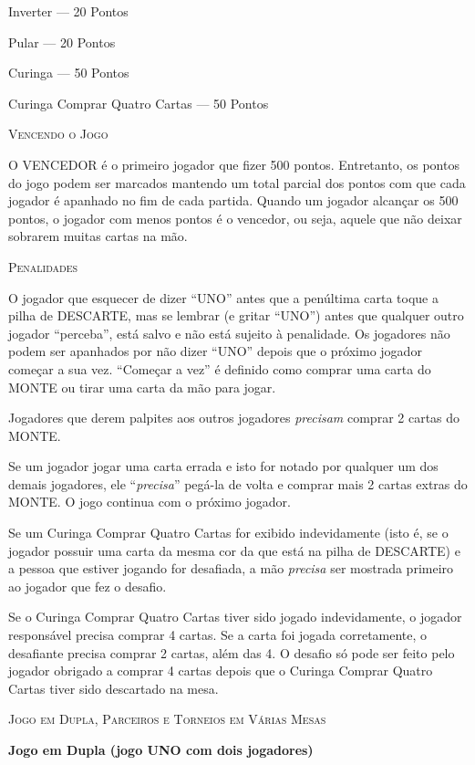 Inverter --- 20 Pontos

Pular --- 20 Pontos

Curinga --- 50 Pontos

Curinga Comprar Quatro Cartas --- 50 Pontos

\textsc{\large{Vencendo o Jogo}}

O VENCEDOR é o primeiro jogador que fizer 500 pontos. Entretanto, os pontos do jogo podem ser marcados mantendo um total parcial dos pontos com que cada jogador é apanhado no fim de cada partida. Quando um jogador alcançar os 500 pontos, o jogador com menos pontos é o vencedor, ou seja, aquele que não deixar sobrarem muitas cartas na mão.

\textsc{\large{Penalidades}}

O jogador que esquecer de dizer ``UNO'' antes que a penúltima carta toque a pilha de DESCARTE, mas se lembrar (e gritar ``UNO'') antes que qualquer outro jogador ``perceba'', está salvo e não está sujeito à penalidade. Os jogadores não podem ser apanhados por não dizer ``UNO'' depois que o próximo jogador começar a sua vez. ``Começar a vez'' é definido como comprar uma carta do MONTE ou tirar uma carta da mão para jogar.

Jogadores que derem palpites aos outros jogadores \textit{precisam} comprar 2 cartas do MONTE.

Se um jogador jogar uma carta errada e isto for notado por qualquer um dos demais jogadores, ele ``\textit{precisa}'' pegá-la de volta e comprar mais 2 cartas extras do MONTE. O jogo continua com o próximo jogador.

Se um Curinga Comprar Quatro Cartas for exibido indevidamente (isto é, se o jogador possuir uma carta da mesma cor da que está na pilha de DESCARTE) e a pessoa que estiver jogando for desafiada, a mão \textit{precisa} ser mostrada primeiro ao jogador que fez o desafio.

Se o Curinga Comprar Quatro Cartas tiver sido jogado indevidamente, o jogador responsável precisa comprar 4 cartas. Se a carta foi jogada corretamente, o desafiante precisa comprar 2 cartas, além das 4. O desafio só pode ser feito pelo jogador obrigado a comprar 4 cartas depois que o Curinga Comprar Quatro Cartas tiver sido descartado na mesa.

\textsc{\large{Jogo em Dupla, Parceiros \newline \indent e Torneios em Várias Mesas}}

\textbf{Jogo em Dupla (jogo UNO com dois jogadores)}

